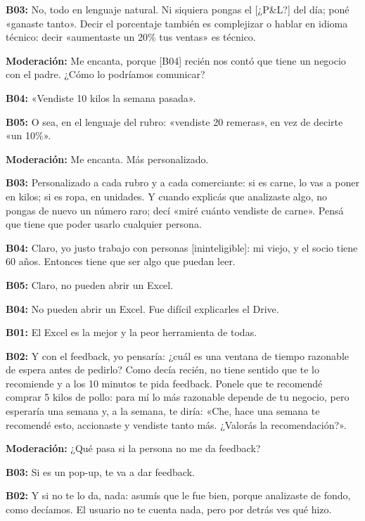 \noindent\textbf{B03:} No, todo en lenguaje natural. Ni siquiera pongas el [¿P\&L?] del día; poné «ganaste tanto». Decir el porcentaje también es complejizar o hablar en idioma técnico: decir «aumentaste un 20\% tus ventas» es técnico.

\noindent\textbf{Moderación:} Me encanta, porque [B04] recién nos contó que tiene un negocio con el padre. ¿Cómo lo podríamos comunicar?

\noindent\textbf{B04:} «Vendiste 10 kilos la semana pasada».

\noindent\textbf{B05:} O sea, en el lenguaje del rubro: «vendiste 20 remeras», en vez de decirte «un 10\%».

\noindent\textbf{Moderación:} Me encanta. Más personalizado.

\noindent\textbf{B03:} Personalizado a cada rubro y a cada comerciante: si es carne, lo vas a poner en kilos; si es ropa, en unidades. Y cuando explicás que analizaste algo, no pongas de nuevo un número raro; decí «miré cuánto vendiste de carne». Pensá que tiene que poder usarlo cualquier persona.

\noindent\textbf{B04:} Claro, yo justo trabajo con personas [ininteligible]: mi viejo, y el socio tiene 60 años. Entonces tiene que ser algo que puedan leer.

\noindent\textbf{B05:} Claro, no pueden abrir un Excel.

\noindent\textbf{B04:} No pueden abrir un Excel. Fue difícil explicarles el Drive.

\noindent\textbf{B01:} El Excel es la mejor y la peor herramienta de todas.

\noindent\textbf{B02:} Y con el feedback, yo pensaría: ¿cuál es una ventana de tiempo razonable de espera antes de pedirlo? Como decía recién, no tiene sentido que te lo recomiende y a los 10 minutos te pida feedback. Ponele que te recomendé comprar 5 kilos de pollo: para mí lo más razonable depende de tu negocio, pero esperaría una semana y, a la semana, te diría: «Che, hace una semana te recomendé esto, accionaste y vendiste tanto más. ¿Valorás la recomendación?».

\noindent\textbf{Moderación:} ¿Qué pasa si la persona no me da feedback?

\noindent\textbf{B03:} Si es un pop-up, te va a dar feedback.

\noindent\textbf{B02:} Y si no te lo da, nada: asumís que le fue bien, porque analizaste de fondo, como decíamos. El usuario no te cuenta nada, pero por detrás ves qué hizo.

